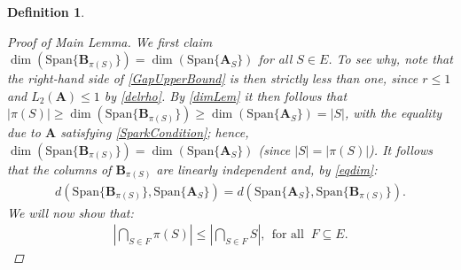 \documentclass[9pt,twocolumn]{pnas-new}
\newtheorem{definition}{Definition}
\begin{document}
\begin{definition}
\begin{proof}[Proof of Main Lemma]
We first claim $\dim(\text{Span}\{\mathbf{B}_{\pi(S)}\}) = \dim(\text{Span}\{\mathbf{A}_{S}\})$ for all $S \in E$. To see why, note that the right-hand side of \eqref{GapUpperBound} is then strictly less than one, since $r \leq 1$ and $L_2(\mathbf{A}) \leq 1$ by \eqref{delrho}. By \eqref{dimLem} it then follows that $|\pi(S)| \geq \dim(\text{Span}\{\mathbf{B}_{\pi(S)}\}) \geq \dim(\text{Span}\{\mathbf{A}_{S}\}) = |S|$, with the equality due to $\mathbf{A}$ satisfying \eqref{SparkCondition}; hence, $\dim(\text{Span}\{\mathbf{B}_{\pi(S)}\}) = \dim(\text{Span}\{\mathbf{A}_{S}\})$ (since $|S| = |\pi(S)|$). It follows that the columns of $\mathbf{B}_{\pi(S)}$ are linearly independent and, by \eqref{eqdim}:%
\begin{align}\label{eq2}
d(\text{Span}\{\mathbf{B}_{\pi(S)}\}, \text{Span}\{\mathbf{A}_S\} ) = d(\text{Span}\{\mathbf{A}_S\}, \text{Span}\{\mathbf{B}_{\pi(S)}\}).
\end{align}
We will now show that:
\begin{align}\label{fact2}
|\bigcap_{S \in F} \pi(S)| \leq |\bigcap_{S \in F} S |, \ \ \text{for all } \ F \subseteq E.
\end{align}


\end{proof}
\end{definition}
\end{document}
